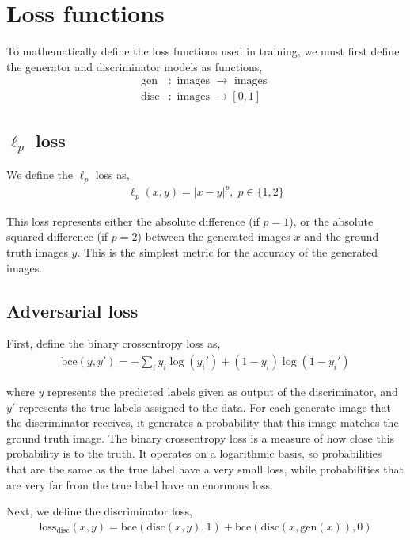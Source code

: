 \documentclass{article}
\begin{document}
\clearpage

\section{Loss functions}

To mathematically define the loss functions used in training, we must first define the generator and discriminator models as functions,
\begin{align*}
    \mathrm{gen} &: \textrm{ images } \to \textrm{ images }\\
    \mathrm{disc} &: \textrm{ images } \to [0, 1]
\end{align*}

\subsection{$\ell_p$ loss}

We define the $\ell_p$ loss as,
\begin{align*}
    \ell_p(x, y) = |x - y|^p,\; p \in \big\{1, 2\big\}
\end{align*}

This loss represents either the absolute difference (if $p = 1$), or the absolute squared difference (if $p = 2$) between the generated images $x$ and the ground truth images $y$. This is the simplest metric for the accuracy of the generated images.

\subsection{Adversarial loss}

First, define the binary crossentropy loss as,
\begin{align*}
    \mathrm{bce}(y, y') = -\sum_i y_i\log(y_i') + (1-y_i)
    \log(1-y_i')
\end{align*}

where $y$ represents the predicted labels given as output of the discriminator, and $y'$ represents the true labels assigned to the data. For each generate image that the discriminator receives, it generates a probability that this image matches the ground truth image. The binary crossentropy loss is a measure of how close this probability is to the truth. It operates on a logarithmic basis, so probabilities that are the same as the true label have a very small loss, while probabilities that are very far from the true label have an enormous loss.

Next, we define the discriminator loss,
\begin{align*}
    \mathrm{loss}_{\mathrm{disc}}(x, y) =
    \mathrm{bce}(\mathrm{disc}(x, y), 1) +
    \mathrm{bce}(\mathrm{disc}(x, \mathrm{gen}(x)), 0)
\end{align*}
\end{document}
